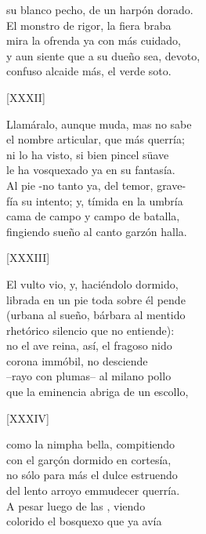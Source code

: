 \documentclass[11pt,a4paper,twoside]{article}
\begin{document}
su blanco pecho, de un harpón dorado.\\
El monstro de rigor, la fiera braba\\
mira la ofrenda ya con más cuidado,\\
y aun siente que a su dueño sea, devoto,\\
confuso alcaide más, el verde soto.\par\pend
%
\begin{center}
	[XXXII]
\end{center}\pstart
Llamáralo, aunque muda, mas no sabe\\
el nombre articular, que más querría;\\
ni lo ha visto, si bien pincel süave\\
le ha vosquexado ya en su fantasía.\\
Al pie -no tanto ya, del temor, grave-\\
fía su intento; y, tímida en la umbría\\
cama de campo y campo de batalla,\\
fingiendo sueño al canto garzón halla.\par\pend
%
\begin{center}
	[XXXIII]
\end{center}\pstart
El vulto vio, y, haciéndolo dormido,\\
librada en un pie toda sobre él pende\\
(urbana al sueño, bárbara al mentido\\
rhetórico silencio que no entiende):\\
no el ave reina, así, el fragoso nido\\
corona immóbil,  no desciende\\
--rayo con plumas-- al milano pollo\\
que la eminencia abriga de un escollo,\par\pend
%
\begin{center}
	[XXXIV]
\end{center}\pstart
como la nimpha bella, compitiendo\\
con el garçón dormido en cortesía,\\
no sólo para más el dulce estruendo\\
del lento arroyo emmudecer querría.\\
A pesar luego de las , viendo\\ colorido el bosquexo que ya avía\\
\end{document}
